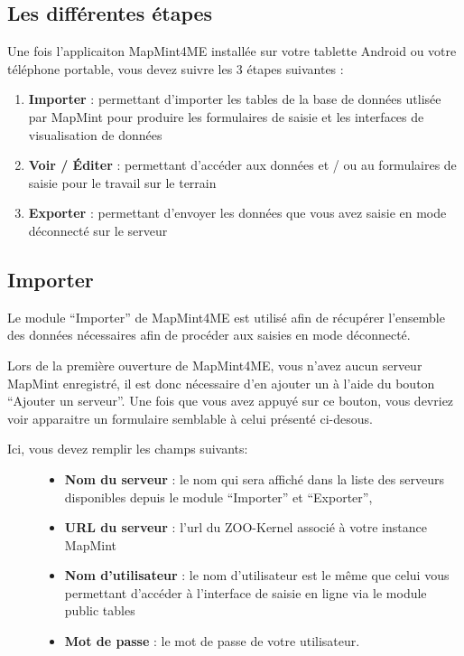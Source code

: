 \documentclass[letterpaper,10pt,english]{sphinxmanual}
\begin{document}
\subsection{Les différentes étapes}
\label{tables/mapmint4me:les-differentes-etapes}
Une fois l'applicaiton MapMint4ME installée sur votre tablette Android ou votre téléphone portable, vous devez suivre les 3 étapes suivantes :
\begin{enumerate}
\item {} 
\textbf{Importer} : permettant d'importer les tables de la base de données utlisée par MapMint pour produire les formulaires de saisie et les interfaces de visualisation de données

\item {} 
\textbf{Voir / Éditer} : permettant d'accéder aux données et / ou au formulaires de saisie pour le travail sur le terrain

\item {} 
\textbf{Exporter} : permettant d'envoyer les données que vous avez saisie en mode déconnecté sur le serveur

\end{enumerate}


\subsection{Importer}
\label{tables/mapmint4me:importer}
Le module ``Importer'' de MapMint4ME est utilisé afin de récupérer l'ensemble des données nécessaires afin de procéder aux saisies en mode déconnecté.

Lors de la première ouverture de MapMint4ME, vous n'avez aucun serveur MapMint enregistré, il est donc nécessaire d'en ajouter un à l'aide du bouton ``Ajouter un serveur''.
Une fois que vous avez appuyé sur ce bouton, vous devriez voir apparaitre un formulaire semblable à celui présenté ci-desous.
\begin{description}
\item[{Ici, vous devez remplir les champs suivants:}] \leavevmode\begin{itemize}
\item {} 
\textbf{Nom du serveur} : le nom qui sera affiché dans la liste des serveurs disponibles depuis le module ``Importer'' et ``Exporter'',

\item {} 
\textbf{URL du serveur} : l'url du ZOO-Kernel associé à votre instance MapMint

\item {} 
\textbf{Nom d'utilisateur} : le nom d'utilisateur est le même que celui vous permettant d'accéder à l'interface de saisie en ligne via le module public tables

\item {} 
\textbf{Mot de passe} : le mot de passe de votre utilisateur.

\end{itemize}

\end{description}
\end{document}

